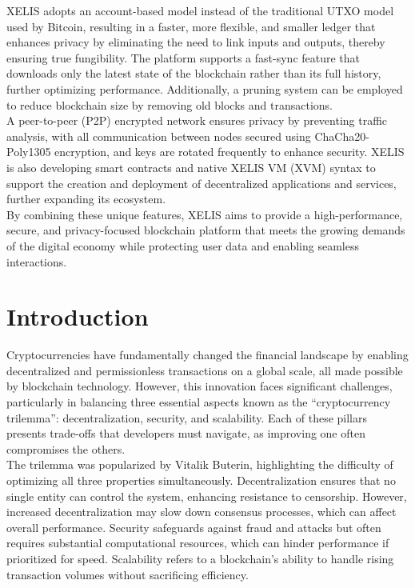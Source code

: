 \documentclass[12pt,a4paper,twocolumn]{article}
\begin{document}
XELIS adopts an account-based model instead of the traditional UTXO model used by Bitcoin, resulting in a faster, more flexible, and smaller ledger that enhances privacy by eliminating the need to link inputs and outputs, thereby ensuring true fungibility. The platform supports a fast-sync feature that downloads only the latest state of the blockchain rather than its full history, further optimizing performance. Additionally, a pruning system can be employed to reduce blockchain size by removing old blocks and transactions.\\

A peer-to-peer (P2P) encrypted network ensures privacy by preventing traffic analysis, with all communication between nodes secured using ChaCha20-Poly1305 encryption, and keys are rotated frequently to enhance security. XELIS is also developing smart contracts and native XELIS VM (XVM) syntax to support the creation and deployment of decentralized applications and services, further expanding its ecosystem.\\

By combining these unique features, XELIS aims to provide a high-performance, secure, and privacy-focused blockchain platform that meets the growing demands of the digital economy while protecting user data and enabling seamless interactions.\\

\section{Introduction}

Cryptocurrencies have fundamentally changed the financial landscape by enabling decentralized and permissionless transactions on a global scale, all made possible by blockchain technology. However, this innovation faces significant challenges, particularly in balancing three essential aspects known as the “cryptocurrency trilemma”: decentralization, security, and scalability. Each of these pillars presents trade-offs that developers must navigate, as improving one often compromises the others.\\

The trilemma was popularized by Vitalik Buterin, highlighting the difficulty of optimizing all three properties simultaneously. Decentralization ensures that no single entity can control the system, enhancing resistance to censorship. However, increased decentralization may slow down consensus processes, which can affect overall performance. Security safeguards against fraud and attacks but often requires substantial computational resources, which can hinder performance if prioritized for speed. Scalability refers to a blockchain's ability to handle rising transaction volumes without sacrificing efficiency.\\
\end{document}

